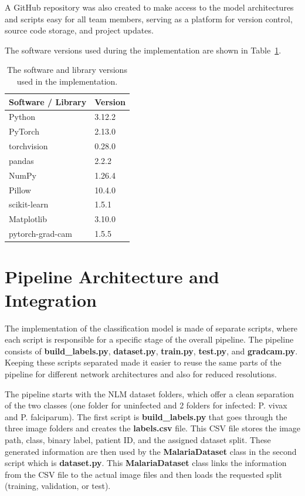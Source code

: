 A GitHub repository was also created to make access to the model architectures and scripts easy for all team members, serving as a platform for version control, source code storage, and project updates.

The software versions used during the implementation are shown in Table~\ref{tab:software_versions}.

\begin{table}[htbp]
    \centering
    \caption{The software and library versions used in the implementation.}
    \label{tab:software_versions}
    \begin{tabular}{|l|l|}
        \hline
        \textbf{Software / Library} & \textbf{Version} \\ \hline
        Python & 3.12.2 \\ \hline
        PyTorch & 2.13.0 \\ \hline
        torchvision & 0.28.0 \\ \hline
        pandas & 2.2.2 \\ \hline
        NumPy & 1.26.4 \\ \hline
        Pillow & 10.4.0 \\ \hline
        scikit-learn & 1.5.1 \\ \hline
        Matplotlib & 3.10.0 \\ \hline
        pytorch-grad-cam & 1.5.5 \\ \hline
    \end{tabular}
\end{table}

\FloatBarrier

\section{Pipeline Architecture and Integration}
\label{sec:pipeline-architecture}


The implementation of the classification model is made of separate scripts, where each script is responsible for a specific stage of the overall pipeline. The pipeline consists of \textbf{build\_labels.py}, \textbf{dataset.py}, \textbf{train.py}, \textbf{test.py}, and \textbf{gradcam.py}. Keeping these scripts separated made it easier to reuse the same parts of the pipeline for different network architectures and also for reduced resolutions.

The pipeline starts with the NLM dataset folders, which offer a clean separation of the two classes (one folder for uninfected and 2 folders for infected: P. vivax and P. falciparum). The first script is \textbf{build\_labels.py} that goes through the three image folders and creates the \textbf{labels.csv} file. This CSV file stores the image path, class, binary label, patient ID, and the assigned dataset split. These generated information are then used by the \textbf{MalariaDataset} class in the second script which is \textbf{dataset.py}. This \textbf{MalariaDataset} class links the information from the CSV file to the actual image files and then loads the requested split (training, validation, or test).

